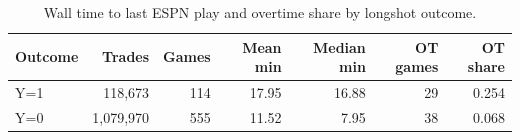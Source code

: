 \begin{table}[!htbp]
\centering
\small
\caption{Wall time to last ESPN play and overtime share by longshot outcome.}
\label{tab:walltime-ot}
\begin{tabular}{lrrrrrr}
\toprule
Outcome & Trades & Games & Mean min & Median min & OT games & OT share \\
\midrule
Y=1 & 118,673 & 114 & 17.95 & 16.88 & 29 & 0.254 \\
Y=0 & 1,079,970 & 555 & 11.52 & 7.95 & 38 & 0.068 \\
\bottomrule
\end{tabular}
\end{table}
